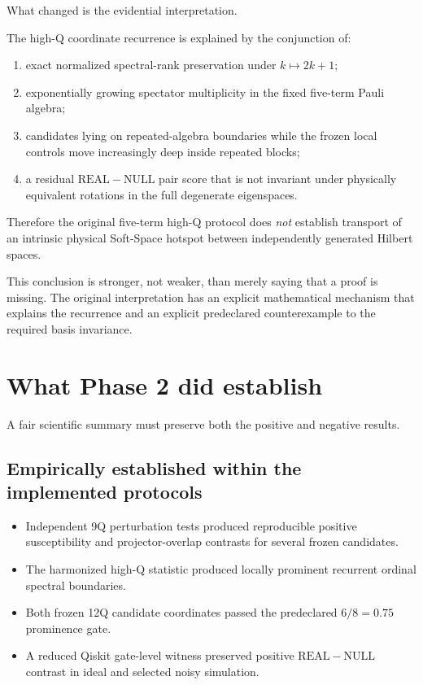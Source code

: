 \documentclass[11pt,a4paper]{article}
\newcommand{\Real}{\mathrm{REAL}}
\newcommand{\Null}{\mathrm{NULL}}
\begin{document}
What changed is the evidential interpretation.

The high-Q coordinate recurrence is explained by the conjunction of:

\begin{enumerate}[label=\arabic*.]
\item exact normalized spectral-rank preservation under
      \(k\mapsto2k+1\);
\item exponentially growing spectator multiplicity in the fixed five-term
      Pauli algebra;
\item candidates lying on repeated-algebra boundaries while the frozen local
      controls move increasingly deep inside repeated blocks;
\item a residual \(\Real-\Null\) pair score that is not invariant under
      physically equivalent rotations in the full degenerate eigenspaces.
\end{enumerate}

Therefore the original five-term high-Q protocol does \emph{not} establish
transport of an intrinsic physical Soft-Space hotspot between independently
generated Hilbert spaces.

This conclusion is stronger, not weaker, than merely saying that a proof is
missing.  The original interpretation has an explicit mathematical mechanism
that explains the recurrence and an explicit predeclared counterexample to the
required basis invariance.

\section{What Phase 2 did establish}

A fair scientific summary must preserve both the positive and negative
results.

\subsection{Empirically established within the implemented protocols}

\begin{itemize}
\item Independent 9Q perturbation tests produced reproducible positive
      susceptibility and projector-overlap contrasts for several frozen
      candidates.
\item The harmonized high-Q statistic produced locally prominent recurrent
      ordinal spectral boundaries.
\item Both frozen 12Q candidate coordinates passed the predeclared
      \(6/8=0.75\) prominence gate.
\item A reduced Qiskit gate-level witness preserved positive
      \(\Real-\Null\) contrast in ideal and selected noisy simulation.
\end{itemize}
\end{document}
